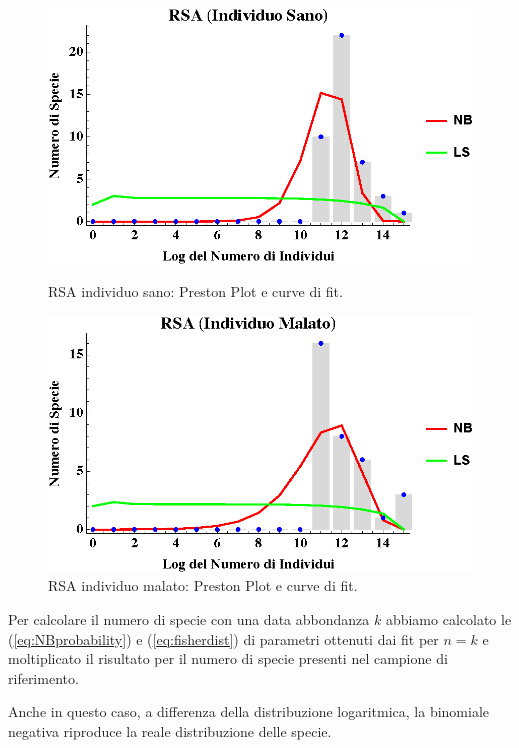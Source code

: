 \begin{figure}[H]
  \centering
  \begin{minipage}[b]{0.45\textwidth}
    \includegraphics[width=\textwidth]{Figure/rsaplotH.eps}
    \caption{RSA individuo sano: Preston Plot e curve di fit.}
    \label{fig:plotRSAH}
  \end{minipage}
  \hfill
  \begin{minipage}[b]{0.45\textwidth}
    \includegraphics[width=\textwidth]{Figure/rsaplotC.eps}
    \caption{RSA individuo malato: Preston Plot e curve di fit.}
    \label{fig:plotRSAC}
  \end{minipage}
\end{figure}

Per calcolare il numero di specie con una data abbondanza $k$ abbiamo calcolato le (\ref{eq:NBprobability}) e (\ref{eq:fisherdist}) di parametri ottenuti dai fit per $n=k$ e moltiplicato il risultato per il numero di specie presenti nel campione di riferimento.


Anche in questo caso, a differenza della distribuzione logaritmica, la binomiale negativa riproduce la reale distribuzione delle specie.

